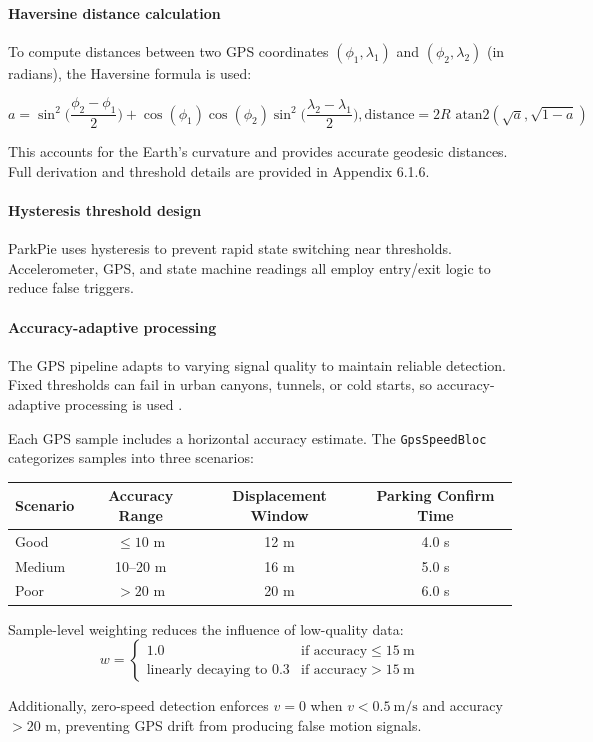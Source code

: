 \paragraph{Haversine distance calculation}

To compute distances between two GPS coordinates $(\phi_1, \lambda_1)$ and $(\phi_2, \lambda_2)$ (in radians), the Haversine formula is used:

\[
a = \sin^2\Big(\frac{\phi_2 - \phi_1}{2}\Big) + \cos(\phi_1)\cos(\phi_2)\sin^2\Big(\frac{\lambda_2 - \lambda_1}{2}\Big),\text{distance} = 2R \text{ atan2}(\sqrt{a}, \sqrt{1-a})
\]

This accounts for the Earth’s curvature and provides accurate geodesic distances. Full derivation and threshold details are provided in Appendix 6.1.6.

\paragraph{Hysteresis threshold design}
ParkPie uses hysteresis to prevent rapid state switching near thresholds. Accelerometer, GPS, and state machine readings all employ entry/exit logic to reduce false triggers.
\paragraph{Accuracy-adaptive processing}

The GPS pipeline adapts to varying signal quality to maintain reliable detection. Fixed thresholds can fail in urban canyons, tunnels, or cold starts, so accuracy-adaptive processing is used \cite{IEEE_KalmanGPS}.  

Each GPS sample includes a horizontal accuracy estimate. The \texttt{GpsSpeedBloc} categorizes samples into three scenarios:

\begin{center}
\begin{tabular}{lccc}
\hline
Scenario & Accuracy Range & Displacement Window & Parking Confirm Time \\
\hline
Good & $\le 10$ m & 12 m & 4.0 s \\
Medium & 10--20 m & 16 m & 5.0 s \\
Poor & $>20$ m & 20 m & 6.0 s \\
\hline
\end{tabular}
\end{center}

Sample-level weighting reduces the influence of low-quality data:
\[
w = 
\begin{cases} 
1.0 & \text{if accuracy} \le 15~\text{m} \\
\text{linearly decaying to } 0.3 & \text{if accuracy} > 15~\text{m}
\end{cases}
\]

Additionally, zero-speed detection enforces $v = 0$ when $v < 0.5~\text{m/s}$ and accuracy $> 20$ m, preventing GPS drift from producing false motion signals.
